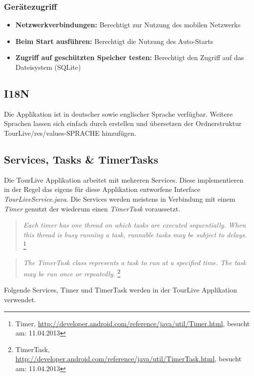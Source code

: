 \subsubsection{Gerätezugriff}
\begin{itemize} [noitemsep,topsep=0pt]
	\item \textbf{Netzwerkverbindungen:} Berechtigt zur Nutzung des mobilen Netzwerks
	\item \textbf{Beim Start ausführen:} Berechtigt die Nutzung des Auto-Starts
	\item \textbf{Zugriff auf geschützten Speicher testen:} Berechtigt den Zugriff auf das Dateisystem (SQLite)
\end{itemize}

\subsection{I18N}
Die Applikation ist in deutscher sowie englischer Sprache verfügbar. Weitere Sprachen lassen sich einfach durch erstellen  und übersetzen der Ordnerstruktur TourLive/res/values-SPRACHE hinzufügen.

\subsection{Services, Tasks \& TimerTasks}
Die TourLive Applikation arbeitet mit mehreren Services. Diese implementieren in der Regel das eigens für diese Applikation entworfene Interface \textit{TourLiveService.java}. Die Services werden meistens in Verbindung mit einem \textit{Timer} genutzt der wiederum einen \textit{TimerTask} voraussetzt.

\begin{quotation}
\textit{Each timer has one thread on which tasks are executed sequentially. When this thread is busy running a task, runnable tasks may be subject to delays.} \footnote{Timer, \url{http://developer.android.com/reference/java/util/Timer.html}, besucht am: 11.04.2013}
\end{quotation}

\begin{quotation}
\textit{The TimerTask class represents a task to run at a specified time. The task may be run once or repeatedly.} \footnote{TimerTask, \url{http://developer.android.com/reference/java/util/TimerTask.html}, besucht am: 11.04.2013}
\end{quotation}

Folgende Services, Timer und TimerTask werden in der TourLive Applikation verwendet.
